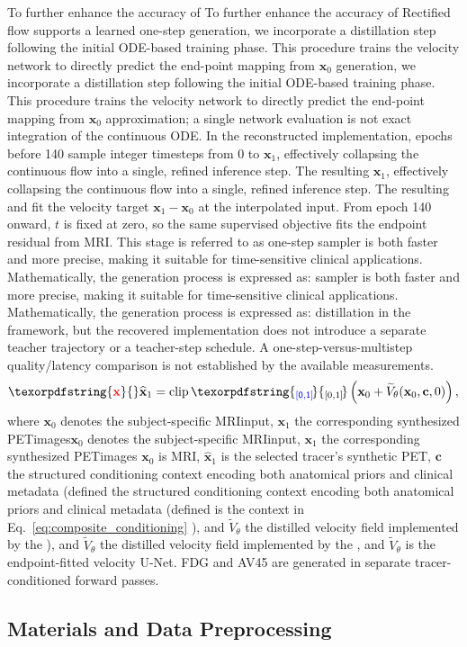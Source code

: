 \documentclass{article}
\providecommand{\DIFaddtex}[1]{{\protect\color{blue} \sf #1}} %
\providecommand{\DIFdeltex}[1]{{\protect\color{red} \ifmmode #1\else\scriptsize #1\fi}} %
\providecommand{\DIFaddbegin}{} %
\providecommand{\DIFaddend}{} %
\providecommand{\DIFdelbegin}{} %
\providecommand{\DIFdelend}{} %
\providecommand{\DIFadd}[1]{\texorpdfstring{\DIFaddtex{#1}}{#1}} %
\providecommand{\DIFdel}[1]{\texorpdfstring{\DIFdeltex{#1}}{}} %
\newcommand{\DIFscaledelfig}{0.5}
\newlength{\DIFdelgraphicswidth} %
\newlength{\DIFdelgraphicsheight} %
\newcommand{\DIFaddincludegraphics}[2][]{{\color{blue}\fbox{\DIFOincludegraphics[#1]{#2}}}} %
\newcommand{\DIFdelincludegraphics}[2][]{%
\sbox{\DIFdelgraphicsbox}{\DIFOincludegraphics[#1]{#2}}%
\settoboxwidth{\DIFdelgraphicswidth}{\DIFdelgraphicsbox} %
\settoboxtotalheight{\DIFdelgraphicsheight}{\DIFdelgraphicsbox} %
\scalebox{\DIFscaledelfig}{%
\parbox[b]{\DIFdelgraphicswidth}{\usebox{\DIFdelgraphicsbox}\\[-\baselineskip] \rule{\DIFdelgraphicswidth}{0em}}\llap{\resizebox{\DIFdelgraphicswidth}{\DIFdelgraphicsheight}{%
\setlength{\unitlength}{\DIFdelgraphicswidth}%
\begin{picture}(1,1)%
\thicklines\linethickness{2pt} %
{\color[rgb]{1,0,0}\put(0,0){\framebox(1,1){}}}%
{\color[rgb]{1,0,0}\put(0,0){\line( 1,1){1}}}%
{\color[rgb]{1,0,0}\put(0,1){\line(1,-1){1}}}%
\end{picture}%
}\hspace*{3pt}}} %
} %
\DeclareRobustCommand{\DIFaddbegin}{\DIFOaddbegin \let\includegraphics\DIFaddincludegraphics} %
\DeclareRobustCommand{\DIFaddend}{\DIFOaddend \let\includegraphics\DIFOincludegraphics} %
\DeclareRobustCommand{\DIFdelbegin}{\DIFOdelbegin \let\includegraphics\DIFdelincludegraphics} %
\DeclareRobustCommand{\DIFdelend}{\DIFOaddend \let\includegraphics\DIFOincludegraphics} %
\begin{document}
\DIFdel{To further enhance the accuracy of }\DIFdelend \DIFaddbegin \DIFadd{Rectified flow supports a learned }\DIFaddend one-step \DIFdelbegin \DIFdel{generation, we incorporate a distillation step following the initial ODE-based training phase. This procedure trains the velocity network to directly predict the end-point mapping from $\mathbf{x}_0$ }\DIFdelend \DIFaddbegin \DIFadd{approximation; a single network evaluation is not exact integration of the continuous ODE. In the reconstructed implementation, epochs before 140 sample integer timesteps from 0 }\DIFaddend to \DIFdelbegin \DIFdel{$\mathbf{x}_1$, effectively collapsing the continuous flow into a single, refined inference step. The resulting }\DIFdelend \DIFaddbegin \DIFadd{999 and fit the velocity target $\mathbf{x}_1-\mathbf{x}_0$ at the interpolated input. From epoch 140 onward, $t$ is fixed at zero, so the same supervised objective fits the endpoint residual from MRI. This stage is referred to as }\DIFaddend one-step \DIFdelbegin \DIFdel{sampler is both faster and more precise, making it suitable for time-sensitive clinical applications. Mathematically, the generation process is expressed as:
}\DIFdelend \DIFaddbegin \DIFadd{distillation in the framework, but the recovered implementation does not introduce a separate teacher trajectory or a teacher-step schedule. A one-step-versus-multistep quality/latency comparison is not established by the available measurements.
}\DIFaddend \begin{equation}
\DIFdelbegin \DIFdel{\mathbf{x}}\DIFdelend \DIFaddbegin \widehat{\mathbf{x}}\DIFaddend _1=\DIFaddbegin \operatorname{clip}\DIFadd{_{[0,1]}\!}\left(\DIFaddend \mathbf{x}_0+\DIFdelbegin %
\DIFdelend \DIFaddbegin \widetilde{V}\DIFaddend _\theta(\mathbf{x}_0,\mathbf{c},0)\DIFaddbegin \right)\DIFaddend ,
\label{eq:onestep_generation}
\end{equation}
where \DIFdelbegin \DIFdel{$\mathbf{x}_0 $ denotes the subject-specific MRIinput, $\mathbf{x}_1 $ the corresponding synthesized PETimages}\DIFdelend \DIFaddbegin \DIFadd{$\mathbf{x}_0$ is MRI, $\widehat{\mathbf{x}}_1$ is the selected tracer's synthetic PET}\DIFaddend , $\mathbf{c}$ \DIFdelbegin \DIFdel{the structured conditioning context encoding both anatomical priors and clinical metadata (defined }\DIFdelend \DIFaddbegin \DIFadd{is the context }\DIFaddend in Eq.~\eqref{eq:composite_conditioning}\DIFdelbegin \DIFdel{), and $\tilde{V}_\theta$ the distilled velocity field implemented by the }\DIFdelend \DIFaddbegin \DIFadd{, and $\widetilde{V}_\theta$ is the endpoint-fitted }\DIFaddend velocity U-Net. \DIFaddbegin \DIFadd{FDG and AV45 are generated in separate tracer-conditioned forward passes.
}\DIFaddend \subsection{Materials and Data Preprocessing}
\end{document}
